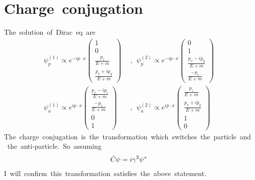 \section{Charge\ conjugation}
The\ solution\ of\ Dirac\ eq\ are
\begin{align*}
    \psi^{(1)}_p\propto e^{-ip\cdot x}\begin{pmatrix}
        1\\
        0\\
        \frac{p_z}{E+m}\\
        \frac{p_x+ip_y}{E+m}
    \end{pmatrix}\ \ &,\ \ \psi^{(2)}_p\propto e^{-ip\cdot x}\begin{pmatrix}
        0\\
        1\\
        \frac{p_x-ip_y}{E+m}\\
        \frac{-p_z}{E+m}
    \end{pmatrix}\\
    \psi^{(1)}_a\propto e^{ip\cdot x}\begin{pmatrix}
        \frac{p_x-ip_i}{E+m}\\
        \frac{-p_z}{E+m}\\
        0\\
        1
    \end{pmatrix}\ \ &,\ \ \psi^{(2)}_a\propto e^{ip\cdot x}\begin{pmatrix}
        \frac{p_z}{E+m}\\
        \frac{p_x+ip_y}{E+m}\\
        1\\
        0
    \end{pmatrix}
\end{align*}
The\ charge\ conjugation\ is\ the\ transformation\ which\ switches\ the\ particle\ and\ the\ anti-particle.\ So\ assuming\ 
\begin{align*}
    \Hat{C}\psi=i\gamma^2\psi^*
\end{align*}
I\ will\ confirm\ this\ transformation\ satisfies\ the\ above\ statement.
